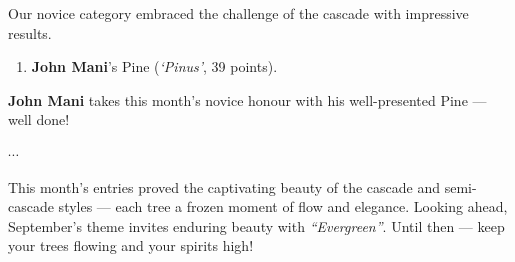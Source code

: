 \noindent
Our novice category embraced the challenge of the cascade with impressive results.

\begin{enumerate}
    \item \textbf{John Mani}'s Pine (\textit{`Pinus'}, 39 points).
\end{enumerate}

\noindent
\textbf{John Mani} takes this month’s novice honour with his well\--presented Pine --- well done!

\vspace{-0.25em}
\begin{center}
    $\cdots$
\end{center}
\vspace{-0.25em}

\noindent
This month’s entries proved the captivating beauty of the cascade and semi\--cascade styles --- each tree a frozen moment of flow and elegance.
Looking ahead, September’s theme invites enduring beauty with \textit{``Evergreen''}.
Until then --- keep your trees flowing and your spirits high!
\closearticle
\columnbreak
